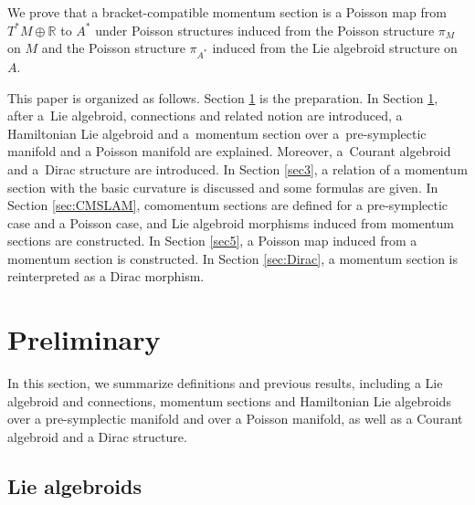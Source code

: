 \documentclass[pdftex]{sigma}
\numberwithin{equation}{section}
\def\bR{{\mathbb{R}}}
\begin{document}
We prove that a bracket-compatible momentum section is a
Poisson map from $T^*M \oplus \bR$ to $A^*$ under Poisson structures
induced from the Poisson structure $\pi_M$ on $M$ and
the Poisson structure $\pi_{A^*}$ induced from
the Lie algebroid structure on $A$.

This paper is organized as follows.
Section \ref{sec2} is the preparation.
In Section \ref{sec2}, after a~Lie algebroid, connections
and related notion are introduced,
a Hamiltonian Lie algebroid and a~momentum section over a~pre-symplectic manifold and a Poisson manifold are explained.
Moreover, a~Courant algebroid and a~Dirac structure are introduced.
In Section \ref{sec3}, a relation of a momentum section
with the basic curvature is discussed and some formulas are given.
In Section \ref{sec:CMSLAM}, comomentum sections are defined for
a pre-symplectic case and a Poisson case, and Lie algebroid morphisms
induced from momentum sections are constructed.
In Section \ref{sec5}, a Poisson map induced from a momentum section is constructed.
In Section \ref{sec:Dirac}, a momentum section is reinterpreted as a Dirac morphism.





\section{Preliminary}\label{sec2}

In this section, we summarize definitions and previous results,
including a Lie algebroid and connections, momentum sections and Hamiltonian Lie algebroids over a pre-symplectic manifold and over a Poisson manifold,
as well as a Courant algebroid and a Dirac structure.

\subsection{Lie algebroids}
\end{document}
